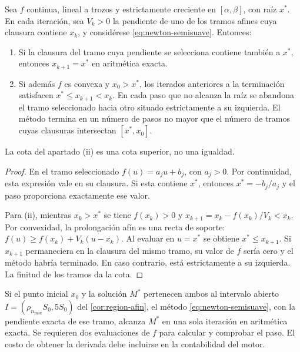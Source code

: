 \begin{aporte}
\begin{theorem}
\label{thm:terminacion-finita}
Sea $f$ continua, lineal a trozos y estrictamente creciente en
$[\alpha,\beta]$, con raíz $x^*$. En cada iteración, sea $V_k>0$ la pendiente
de uno de los tramos afines cuya clausura contiene $x_k$, y considérese
\cref{eq:newton-semisuave}. Entonces:
\begin{enumerate}[label=(\roman*),leftmargin=*]
  \item Si la clausura del tramo cuya pendiente se selecciona contiene
        también a $x^*$, entonces $x_{k+1}=x^*$ en aritmética exacta.
  \item Si además $f$ es convexa y $x_0>x^*$, los iterados anteriores a la
        terminación satisfacen $x^*\le x_{k+1}<x_k$. En cada paso que no alcanza
        la raíz se abandona el tramo seleccionado hacia otro situado
        estrictamente a su izquierda. El método termina en un número de
        pasos no mayor que el número de tramos cuyas clausuras intersectan
        $[x^*,x_0]$.
\end{enumerate}
La cota del apartado (ii) es una cota superior, no una igualdad.
\end{theorem}
\begin{proof}
En el tramo seleccionado $f(u)=a_ju+b_j$, con $a_j>0$. Por continuidad,
esta expresión vale en su clausura. Si esta contiene $x^*$, entonces
$x^*=-b_j/a_j$ y el paso proporciona exactamente ese valor.

Para (ii), mientras $x_k>x^*$ se tiene $f(x_k)>0$ y
$x_{k+1}=x_k-f(x_k)/V_k<x_k$. Por convexidad, la prolongación afín es una recta
de soporte: $f(u)\ge f(x_k)+V_k(u-x_k)$. Al evaluar en $u=x^*$ se obtiene
$x^*\le x_{k+1}$. Si $x_{k+1}$ permaneciera en la clausura del mismo tramo,
su valor de $f$ sería cero y el método habría terminado. En caso contrario,
está estrictamente a su izquierda. La finitud de los tramos da la cota.
\end{proof}
\end{aporte}

\begin{corollary}
\label{cor:un-paso}
Si el punto inicial $x_0$ y la solución $M^*$ pertenecen ambos al intervalo
abierto $I=(\rho_{n_{\max}}S_0,5S_0)$ del \cref{cor:region-afin}, el método
\cref{eq:newton-semisuave}, con la pendiente exacta de ese tramo, alcanza
$M^*$ en una sola iteración en aritmética exacta. Se requieren dos
evaluaciones de $f$ para calcular y comprobar el paso. El costo de obtener
la derivada debe incluirse en la contabilidad del motor.
\end{corollary}

